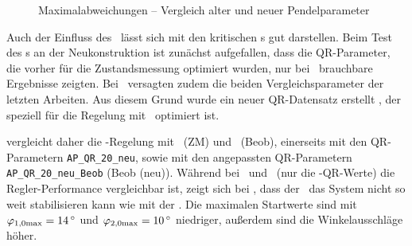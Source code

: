 \begin{figure}[htb]
	\caption{Maximalabweichungen -- Vergleich alter und neuer Pendelparameter}
	\label{fig:vglpendelpar}
\end{figure}

Auch der Einfluss des \beob\ lässt sich mit den kritischen \xots s gut darstellen.
Beim Test des \beob s an der Neukonstruktion ist zunächst aufgefallen, dass die QR-Parameter, die vorher für die Zustandsmessung optimiert wurden, nur bei \apz\ brauchbare Ergebnisse zeigten.
Bei \apv\ versagten zudem die beiden Vergleichsparameter der letzten Arbeiten.
Aus diesem Grund wurde ein neuer QR-Datensatz erstellt , der speziell für die Regelung mit \beob\ optimiert ist.

 vergleicht daher die \ap-Regelung mit \zm\ (ZM) und \beob\ (Beob), einerseits mit den QR-Parametern \texttt{AP\_QR\_20\_neu}, sowie mit den angepassten QR-Parametern \texttt{AP\_QR\_20\_neu\_Beob} (Beob (neu)).
Während bei \apz\ und \apd\ (nur die \beob-QR-Werte) die Regler-Performance vergleichbar ist, zeigt sich bei \apv, dass der \beob\ das System nicht so weit stabilisieren kann wie mit der \zm. 
Die maximalen Startwerte sind mit $\varphi_{1,0\mrm{max}}=\valdeg{14}$ und $\varphi_{2,0\mrm{max}}=\valdeg{10}$ niedriger, außerdem sind die Winkelausschläge höher.

